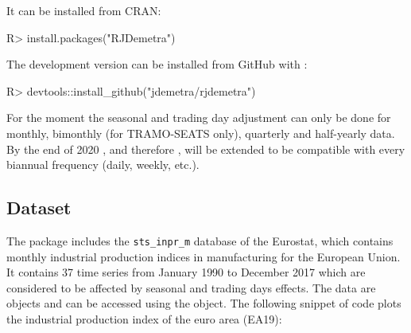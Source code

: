 \documentclass[article]{jss}
\begin{document}
It can be installed from CRAN:

\begin{CodeChunk}

\begin{CodeInput}
R> install.packages("RJDemetra")
\end{CodeInput}
\end{CodeChunk}

The development version can be installed from GitHub with 
\citep{devtools}:

\begin{CodeChunk}

\begin{CodeInput}
R> devtools::install_github("jdemetra/rjdemetra")
\end{CodeInput}
\end{CodeChunk}

For the moment the seasonal and trading day adjustment can only be done
for monthly, bimonthly (for TRAMO-SEATS only), quarterly and half-yearly
data. By the end of 2020 , and therefore
, will be extended to be compatible with every biannual
frequency (daily, weekly, etc.).

\hypertarget{dataset}{%
\subsection{Dataset}\label{dataset}}

The package  includes the \texttt{sts\_inpr\_m} database
of the Eurostat, which contains monthly industrial production indices in
manufacturing for the European Union. It contains 37 time series from
January 1990 to December 2017 which are considered to be affected by
seasonal and trading days effects. The data are  objects and
can be accessed using the  object. The following snippet
of code plots the industrial production index of the euro area (EA19):
\end{document}
